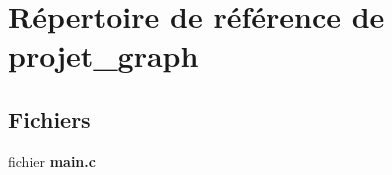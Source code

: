 \section{Répertoire de référence de projet\-\_\-graph}
\label{dir_f69693d9def350ebed926410d68d9279}
\subsection*{Fichiers}
\begin{DoxyCompactItemize}
\item 
fichier {\bf main.\-c}
\end{DoxyCompactItemize}
